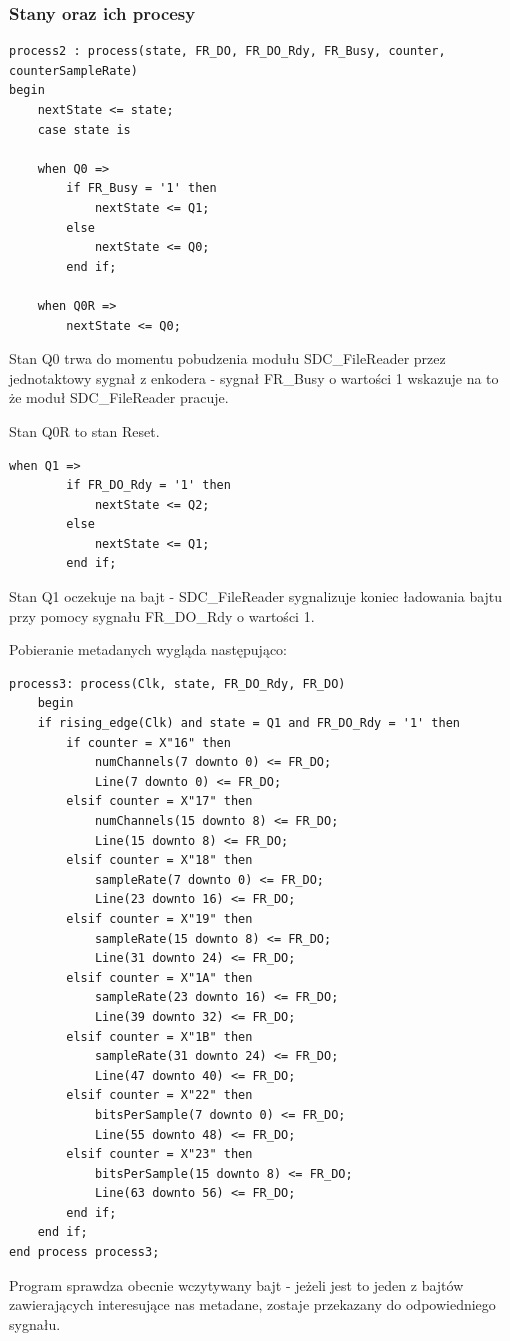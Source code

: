 \documentclass{article}
\begin{document}
\subsubsection{Stany oraz ich procesy}
\begin{lstlisting}[basicstyle=\small]
process2 : process(state, FR_DO, FR_DO_Rdy, FR_Busy, counter, counterSampleRate)
begin
	nextState <= state;
	case state is
	
	when Q0 =>
		if FR_Busy = '1' then
			nextState <= Q1;
		else
			nextState <= Q0;
		end if;
		
	when Q0R =>
		nextState <= Q0;
\end{lstlisting}
\par Stan Q0 trwa do momentu pobudzenia modułu SDC\_FileReader przez jednotaktowy sygnał z enkodera - sygnał FR\_Busy o wartości 1 wskazuje na to że moduł SDC\_FileReader pracuje.
\par Stan Q0R to stan Reset.
\begin{lstlisting}[basicstyle=\small]
	when Q1 =>
		if FR_DO_Rdy = '1' then              
			nextState <= Q2;
		else
			nextState <= Q1;
		end if;
\end{lstlisting}
\par Stan Q1 oczekuje na bajt - SDC\_FileReader sygnalizuje koniec ładowania bajtu przy pomocy sygnału FR\_DO\_Rdy o wartości 1. 
\par Pobieranie metadanych wygląda następująco:
\begin{lstlisting}[basicstyle=\small]
process3: process(Clk, state, FR_DO_Rdy, FR_DO)
	begin
	if rising_edge(Clk) and state = Q1 and FR_DO_Rdy = '1' then
		if counter = X"16" then
			numChannels(7 downto 0) <= FR_DO;
			Line(7 downto 0) <= FR_DO;
		elsif counter = X"17" then
			numChannels(15 downto 8) <= FR_DO;
			Line(15 downto 8) <= FR_DO;
		elsif counter = X"18" then
			sampleRate(7 downto 0) <= FR_DO;
			Line(23 downto 16) <= FR_DO;
		elsif counter = X"19" then
			sampleRate(15 downto 8) <= FR_DO;
			Line(31 downto 24) <= FR_DO;
		elsif counter = X"1A" then
			sampleRate(23 downto 16) <= FR_DO;
			Line(39 downto 32) <= FR_DO;
		elsif counter = X"1B" then
			sampleRate(31 downto 24) <= FR_DO;
			Line(47 downto 40) <= FR_DO;
		elsif counter = X"22" then
			bitsPerSample(7 downto 0) <= FR_DO;
			Line(55 downto 48) <= FR_DO;
		elsif counter = X"23" then
			bitsPerSample(15 downto 8) <= FR_DO;
			Line(63 downto 56) <= FR_DO;
		end if;
	end if;
end process process3; 
\end{lstlisting}
\par Program sprawdza obecnie wczytywany bajt - jeżeli jest to jeden z bajtów zawierających interesujące nas metadane, zostaje przekazany do odpowiedniego sygnału.
\end{document}
